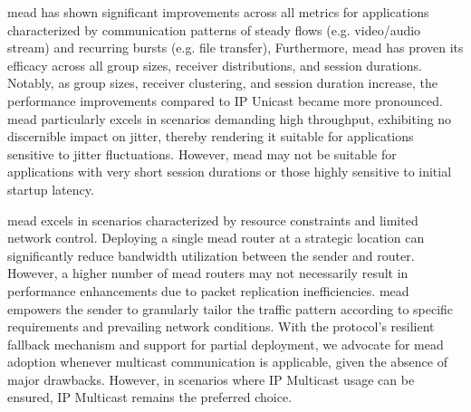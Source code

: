 \gls{mead} has shown significant improvements across all metrics for
    applications characterized by communication patterns of steady flows
    (e.g. video/audio stream) and recurring bursts (e.g. file transfer),
Furthermore, \gls{mead} has proven its efficacy across all group sizes,
    receiver distributions, and session durations.
Notably, as group sizes, receiver clustering, and session duration increase,
    the performance improvements compared to IP Unicast became more pronounced.
\gls{mead} particularly excels in scenarios demanding high throughput,
    exhibiting no discernible impact on jitter, thereby rendering it suitable
    for applications sensitive to jitter fluctuations.
However, \gls{mead} may not be suitable for applications with very short
    session durations or those highly sensitive to initial startup latency.

\gls{mead} excels in scenarios characterized by resource constraints and
    limited network control.
Deploying a single \gls{mead} router at a strategic location can significantly
    reduce bandwidth utilization between the sender and router.
However, a higher number of \gls{mead} routers may not necessarily result in
    performance enhancements due to packet replication inefficiencies.
\gls{mead} empowers the sender to granularly tailor the traffic pattern
    according to specific requirements and prevailing network conditions.
With the protocol's resilient fallback mechanism and support for partial
    deployment, we advocate for \gls{mead} adoption whenever multicast
    communication is applicable, given the absence of major drawbacks.
However, in scenarios where IP Multicast usage can be ensured, IP Multicast
    remains the preferred choice.

